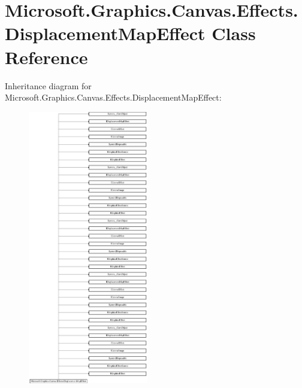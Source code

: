 \hypertarget{class_microsoft_1_1_graphics_1_1_canvas_1_1_effects_1_1_displacement_map_effect}{}\section{Microsoft.\+Graphics.\+Canvas.\+Effects.\+Displacement\+Map\+Effect Class Reference}
\label{class_microsoft_1_1_graphics_1_1_canvas_1_1_effects_1_1_displacement_map_effect}
Inheritance diagram for Microsoft.\+Graphics.\+Canvas.\+Effects.\+Displacement\+Map\+Effect\+:\begin{figure}[H]
\begin{center}
\leavevmode
\includegraphics[height=12.000000cm]{class_microsoft_1_1_graphics_1_1_canvas_1_1_effects_1_1_displacement_map_effect}
\end{center}
\end{figure}
